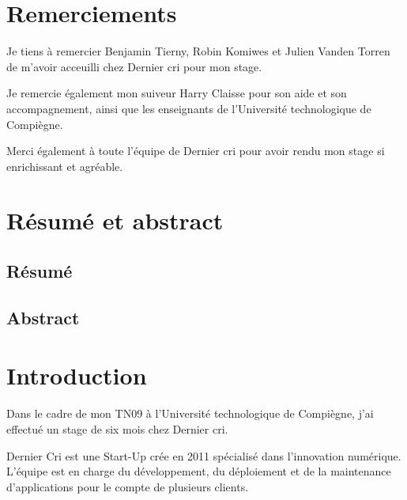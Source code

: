 \newpage

\section{Remerciements}\label{remerciements}

\bigskip

Je tiens à remercier Benjamin Tierny, Robin Komiwes et Julien Vanden
Torren de m'avoir acceuilli chez Dernier cri pour mon stage.

\bigskip

Je remercie également mon suiveur Harry Claisse pour son aide et son
accompagnement, ainsi que les enseignants de l'Université technologique
de Compiègne.

\bigskip

Merci également à toute l'équipe de Dernier cri pour avoir rendu mon
stage si enrichissant et agréable.

\newpage

\section{Résumé et abstract}\label{ruxe9sumuxe9-et-abstract}

\bigskip

\subsection{Résumé}\label{ruxe9sumuxe9}

\newpage

\subsection{Abstract}\label{abstract}

\newpage

\section{Introduction}\label{introduction}

\bigskip

Dans le cadre de mon TN09 à l'Université technologique de Compiègne,
j'ai effectué un stage de six mois chez Dernier cri.

\bigskip

Dernier Cri est une Start-Up crée en 2011 spécialisé dans l'innovation
numérique. L'équipe est en charge du développement, du déploiement et de
la maintenance d'applications pour le compte de plusieurs clients.

